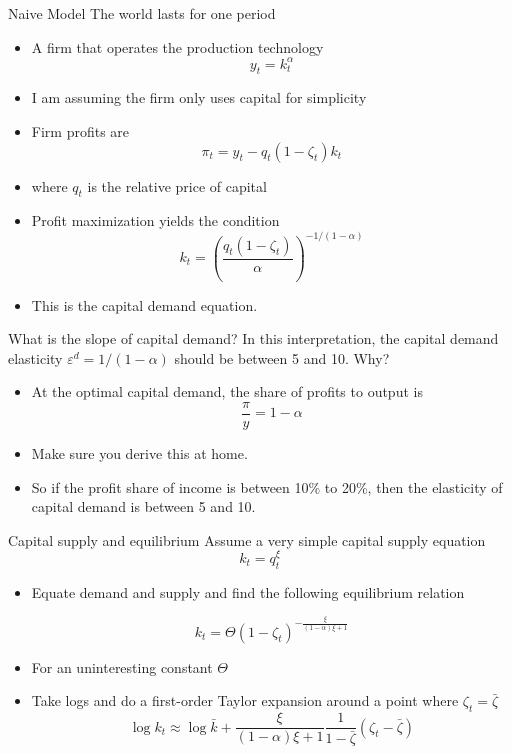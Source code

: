\documentclass[11pt,aspectratio=169,xcolor={dvipsnames},hyperref={pdftex,pdfpagemode=UseNone,hidelinks,pdfdisplaydoctitle=true},usepdftitle=false]{beamer}
\begin{document}
\begin{frame}{Naive Model}
The world lasts for one period
\begin{itemize}
\item A firm that operates the production technology
\[y_t = k_t^{\alpha} \]
\item I am assuming the firm only uses capital for simplicity 
\item Firm profits are
\[\pi_t = y_t - q_t (1-\zeta_t)k_t \]
\item where $q_t$ is the relative price of capital
\item Profit maximization yields the condition \[k_t = \left(\frac{q_t (1-\zeta_t)}{\alpha}\right)^{-1/(1-\alpha)}\]
\item This is the capital demand equation.
\end{itemize}
\end{frame}

\begin{frame}{What is the slope of capital demand?}
In this interpretation, the capital demand elasticity $ \varepsilon^d = 1/(1-\alpha)$ should be between 5 and 10. Why?
\begin{itemize}
\item At the optimal capital demand, the share of profits to output is
\[\frac{\pi}{y} = 1-\alpha\]
\item Make sure you derive this at home. 
\item So if the profit share of income is between 10\% to 20\%, then the elasticity of capital demand is between 5 and 10.
\end{itemize}

\end{frame}

\begin{frame}{Capital supply and equilibrium}
Assume a very simple capital supply equation
\[k_t = q_t^{\xi}\]
\begin{itemize}
\item Equate demand and supply and find the following equilibrium relation

\[k_t  = \Theta (1-\zeta_t)^{-\frac{\xi}{(1-\alpha)\xi + 1}}\]
\item For an uninteresting constant $\Theta$
\item Take logs and do a first-order Taylor expansion around a point where $\zeta_t = \bar{\zeta}$
\[\log k_t \approx \log \bar{k} + \frac{\xi}{(1-\alpha)\xi + 1} \frac{1}{1-\bar{\zeta}} (\zeta_t - \bar{\zeta})\]
\end{itemize}
\end{frame}
\end{document}
